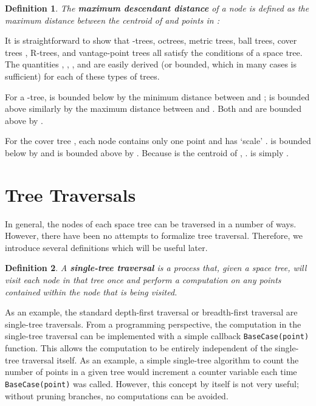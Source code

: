 \documentclass{article}
\newtheorem{defn}{Definition}
\begin{document}
\begin{defn}
The \textbf{maximum descendant distance} of a node  is defined as
the maximum distance between the centroid  of  and points in :

\vspace*{-1.3em}

\end{defn}
\vspace*{-1.0em}



It is straightforward to show that -trees, octrees, metric trees, ball
trees, cover trees \cite{langford2006}, R-trees, and vantage-point trees all
satisfy the conditions of a space tree.  The quantities , ,
, and  are easily derived (or
bounded, which in many cases is sufficient) for each of these types of trees.

\vspace*{-0.2em}
For a -tree,  is bounded below by
the minimum distance between  and ;
 is bounded above similarly by the
maximum distance between  and .  Both
 and  are bounded above by
.


\vspace*{-0.2em}
For the cover tree \cite{langford2006}, each node  contains only
one point  and has `scale' .  
is bounded below by  and
 is bounded above by .  Because  is the centroid of ,
.   is simply .

\vspace*{-0.5em}
\section{Tree Traversals}
\label{sec:traversers}

In general, the nodes of each space tree can be traversed in a number of ways.
However, there have been no attempts to formalize tree traversal.  Therefore, we
introduce several definitions which will be useful later.

\vspace*{0.4em}
\begin{defn}
A \textbf{single-tree traversal} is a process that, given a space tree, will
visit each node in that tree once and perform a computation on any points
contained within the node that is being visited.
\end{defn}

As an example, the standard depth-first traversal or breadth-first traversal
are single-tree traversals.  From a programming perspective, the computation in
the single-tree traversal can be implemented with a simple callback
\texttt{BaseCase(point)} function.  This allows the computation to be entirely
independent of the single-tree traversal itself.  As an example, a simple
single-tree algorithm to count the number of points in a given tree would
increment a counter variable each time \texttt{BaseCase(point)} was called.
However, this concept by itself is not very useful; without pruning branches, no
computations can be avoided.
\end{document}
